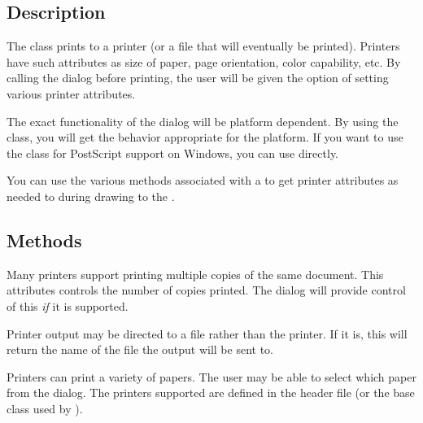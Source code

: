 \subsection* {Description}

The  class prints to a printer (or a file that
will eventually be printed). Printers have such attributes as
size of paper, page orientation, color capability, etc. By
calling the  dialog before printing, the
user will be given the option of setting various printer
attributes.

The exact functionality of the  dialog will be
platform dependent. By using the  class, you will
get the behavior appropriate for the platform. If you want to use
the  class for PostScript support on Windows,
you can use  directly.

You can use the various methods associated with a 
to get printer attributes as needed to during drawing to
the .

\subsection* {Methods}



Many printers support printing multiple copies of the same
document. This attributes controls the number of copies printed.
The  dialog will provide control of this \emph{if} it
is supported.


Printer output may be directed to a file rather than the printer.
If it is, this will return the name of the file the output will
be sent to.



Printers can print a variety of papers. The user may be
able to select which paper from the  dialog.
The printers supported are defined in the 
header file (or the base class used by ).



